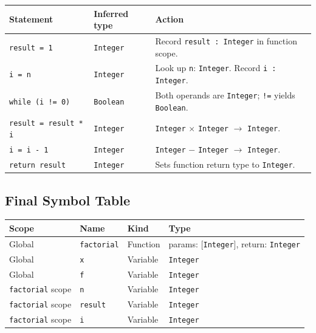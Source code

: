 \documentclass[11pt,a4paper]{article}
\begin{document}
\begin{center}
\begin{tabular}{p{5cm}p{2.5cm}p{5cm}}
  \toprule
  \textbf{Statement} & \textbf{Inferred type} & \textbf{Action} \\
  \midrule
  \texttt{result = 1}
    & \texttt{Integer}
    & Record \texttt{result : Integer} in function scope. \\[4pt]
  \texttt{i = n}
    & \texttt{Integer}
    & Look up \texttt{n}: \texttt{Integer}.  Record \texttt{i : Integer}. \\[4pt]
  \texttt{while (i != 0)}
    & \texttt{Boolean}
    & Both operands are \texttt{Integer}; \texttt{!=} yields \texttt{Boolean}. \\[4pt]
  \texttt{result = result * i}
    & \texttt{Integer}
    & \texttt{Integer} $\times$ \texttt{Integer} $\rightarrow$ \texttt{Integer}. \\[4pt]
  \texttt{i = i - 1}
    & \texttt{Integer}
    & \texttt{Integer} $-$ \texttt{Integer} $\rightarrow$ \texttt{Integer}. \\[4pt]
  \texttt{return result}
    & \texttt{Integer}
    & Sets function return type to \texttt{Integer}. \\
  \bottomrule
\end{tabular}
\end{center}

\subsection*{Final Symbol Table}

\begin{center}
\begin{tabular}{llll}
  \toprule
  \textbf{Scope} & \textbf{Name} & \textbf{Kind} & \textbf{Type} \\
  \midrule
  Global                   & \texttt{factorial} & Function & params: [\texttt{Integer}], return: \texttt{Integer} \\
  Global                   & \texttt{x}         & Variable & \texttt{Integer} \\
  Global                   & \texttt{f}         & Variable & \texttt{Integer} \\
  \texttt{factorial} scope & \texttt{n}         & Variable & \texttt{Integer} \\
  \texttt{factorial} scope & \texttt{result}    & Variable & \texttt{Integer} \\
  \texttt{factorial} scope & \texttt{i}         & Variable & \texttt{Integer} \\
  \bottomrule
\end{tabular}
\end{center}
\end{document}
